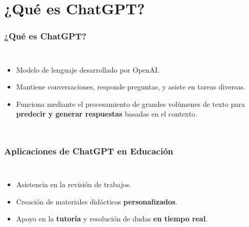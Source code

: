 \section{¿Qué es ChatGPT?}

\begin{frame}
    \frametitle{¿Qué es ChatGPT?}
    \begin{columns}
    \begin{itemize}[leftmargin=*]
        \item Modelo de lenguaje desarrollado por OpenAI.
        \item Mantiene conversaciones, responde preguntas, y asiste en tareas diversas.
        \item Funciona mediante el procesamiento de grandes volúmenes de texto para \textbf{predecir y generar respuestas} basadas en el contexto.
    \end{itemize}
    \end{columns}
\end{frame}


\begin{frame}
    \frametitle{Aplicaciones de ChatGPT en Educación}
    \begin{columns}
        \begin{itemize}[leftmargin=*]
            \item Asistencia en la revisión de trabajos.
            \item Creación de materiales didácticos \textbf{personalizados}.
            \item Apoyo en la \textbf{tutoría} y resolución de dudas \textbf{en tiempo real}.
        \end{itemize}
    \vspace{3mm}
    \end{columns}
\end{frame}
